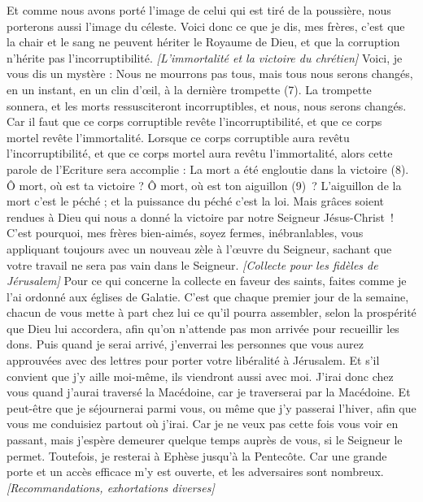 \begin{multicols}{2}
Et comme nous avons porté l'image de celui qui est tiré de la poussière, nous porterons aussi l'image du céleste.
Voici donc ce que je dis, mes frères, c'est que la chair et le sang ne peuvent hériter le Royaume de Dieu, et que la corruption n'hérite pas l'incorruptibilité.
\textit{[L'immortalité et la victoire du chrétien]}
Voici, je vous dis un mystère : Nous ne mourrons pas tous, mais tous nous serons changés,
en un instant, en un clin d’œil, à la dernière trompette (7). La trompette sonnera, et les morts ressusciteront incorruptibles, et nous, nous serons changés.
Car il faut que ce corps corruptible revête l'incorruptibilité, et que ce corps mortel revête l'immortalité.
Lorsque ce corps corruptible aura revêtu l'incorruptibilité, et que ce corps mortel aura revêtu l'immortalité, alors cette parole de l'Ecriture sera accomplie : La mort a été engloutie dans la victoire (8).
Ô mort, où est ta victoire ? Ô mort, où est ton aiguillon (9) ?
L'aiguillon de la mort c'est le péché ; et la puissance du péché c'est la loi.
Mais grâces soient rendues à Dieu qui nous a donné la victoire par notre Seigneur Jésus-Christ !
C'est pourquoi, mes frères bien-aimés, soyez fermes, inébranlables, vous appliquant toujours avec un nouveau zèle à l’œuvre du Seigneur, sachant que votre travail ne sera pas vain dans le Seigneur.
\textit{[Collecte pour les fidèles de Jérusalem]}
\VerseOne{}Pour ce qui concerne la collecte en faveur des saints, faites comme je l’ai ordonné aux églises de Galatie.
C’est que chaque premier jour de la semaine, chacun de vous mette à part chez lui ce qu’il pourra assembler, selon la prospérité que Dieu lui accordera, afin qu’on n’attende pas mon arrivée pour recueillir les dons.
Puis quand je serai arrivé, j'enverrai les personnes que vous aurez approuvées avec des lettres pour porter votre libéralité à Jérusalem.
Et s’il convient que j’y aille moi-même, ils viendront aussi avec moi.
J'irai donc chez vous quand j’aurai traversé la Macédoine, car je traverserai par la Macédoine.
Et peut-être que je séjournerai parmi vous, ou même que j'y passerai l'hiver, afin que vous me conduisiez partout où j’irai.
Car je ne veux pas cette fois vous voir en passant, mais j’espère demeurer quelque temps auprès de vous, si le Seigneur le permet.
Toutefois, je resterai à Ephèse jusqu'à la Pentecôte.
Car une grande porte et un accès efficace m'y est ouverte, et les adversaires sont nombreux.
\textit{[Recommandations, exhortations diverses]}

\end{multicols}

